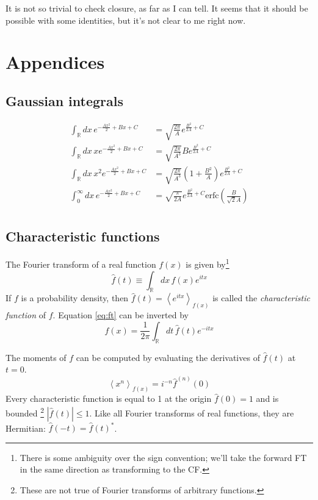 \documentclass{article}
\newcommand{\intR}{\int_{\mathbb{R}}}
\begin{document}
It is not so trivial to check closure, as far as I can tell. It seems that it
should be possible with some identities, but it's not clear to me right now.

\section*{Appendices}
\subsection*{Gaussian integrals}

\begin{align}
	\intR dx \, e^{-\frac{A x^2}{2} + B x + C}             & = \sqrt{\frac{2\pi}{A}} e^{\frac{B^2}{2A} + C}                                               \\
	\intR dx \, x e^{-\frac{A x^2}{2} + B x + C}           & = \sqrt{\frac{2\pi}{A^3}} B e^{\frac{B^2}{2A} + C}                                           \\
	\intR dx \, x^2 e^{-\frac{A x^2}{2} + B x + C}         & = \sqrt{\frac{2\pi}{A^3}} \left( 1 + \frac{B^2}{A} \right) e^{\frac{B^2}{2A} + C}            \\
	\int_{0}^{\infty} dx \, e^{-\frac{A x^2}{2} + B x + C} & = \sqrt{\frac{\pi}{2A}} e^{\frac{B^2}{2A} + C} \mathrm{erfc}\left(\frac{B}{\sqrt{2}A}\right) \\
\end{align}

\subsection*{Characteristic functions}
The Fourier transform of a real function $f(x)$ is given by\footnote{There is
	some ambiguity over the sign convention; we'll take the forward FT in the
	same direction as transforming to the CF.}
\begin{equation}
	\hat{f}(t) \equiv \intR dx\, f(x) e^{itx}
	\label{eq:ft}
\end{equation}
If $f$ is a probability density, then $\hat{f}(t) = \left< e^{itx}
	\right>_{f(x)}$ is called the \emph{characteristic function} of $f$. Equation \ref{eq:ft} can be inverted by
\begin{equation}
	f(x) = \frac{1}{2\pi} \intR dt\, \hat{f}(t) e^{-itx}
\end{equation}

The moments of $f$ can be computed by evaluating the derivatives of $\hat f (t)$ at $t=0$.
\begin{equation}
	\left< x^n \right>_{f(x)} = i^{-n} \hat f^{(n)}(0)
\end{equation}
Every characteristic function is equal to 1 at the
origin $\hat f (0) = 1$ and is bounded
\footnote{These are not true of Fourier transforms of arbitrary functions.}
$|\hat f (t) | \leq 1$.
Like all Fourier transforms of real functions, they are Hermitian: $\hat f (-t) = \hat f(t)^*$.
\end{document}
